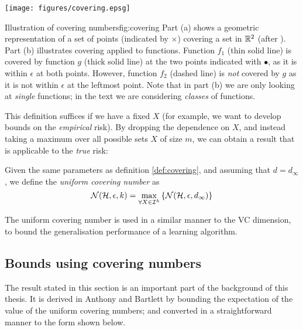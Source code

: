 \begin{linefigure}
\begin{center}
\texttt{[image: figures/covering.epsg]}
\end{center}
\begin{capt}{Illustration of covering numbers}{fig:covering}
Part (a) shows a geometric representation of a set of points
(indicated by $\times$) covering a set in $\mathbb{R}^2$ (after
\cite{Anthony98}).  Part (b) illustrates covering applied to
functions.  Function $f_1$ (thin solid line) is covered by function
$g$ (thick solid line) at the two points indicated with $\bullet$, as
it is within $\epsilon$ at both points. However, function $f_2$
(dashed line) is \emph{not} covered by $g$ as it is not within
$\epsilon$ at the leftmost point.  Note that in part (b) we are only
looking at \emph{single} functions; in the text we are considering
\emph{classes} of functions.
\end{capt}
\end{linefigure}

This definition suffices if we have a fixed $X$ (for example, we want
to develop bounds on the \emph{empirical} risk).  By dropping the
dependence on $X$, and instead taking a maximum over all possible sets
$X$ of size $m$, we can obtain a result that is applicable to the
\emph{true} risk: 

\begin{definition}
Given the same parameters as definition \ref{def:covering}, and
assuming that $d = d_{\infty}$, we define
the \emph{uniform covering number} as
\begin{equation}
\label{eqn:uniform covering numbers}
\mathcal{N}({\mathcal{H}}, {\epsilon}, {k}) = \max_{\forall X \in \mathcal{I}^k} \left\{
\mathcal{N}({\mathcal{H}}, {\epsilon}, {d_{\infty}}) \right\} 
\end{equation}
\end{definition}

The uniform covering number is used in a similar manner to the VC
dimension, to bound the generalisation performance of a learning
algorithm. 

\subsection{Bounds using covering numbers}
\label{sec:covering number bounds}

The result stated in this section is an important part of the
background of this thesis.  It is derived in Anthony and Bartlett
\cite{Anthony98} by bounding the expectation of the value of the
uniform covering numbers; and converted in a straightforward manner to
the form shown below.

